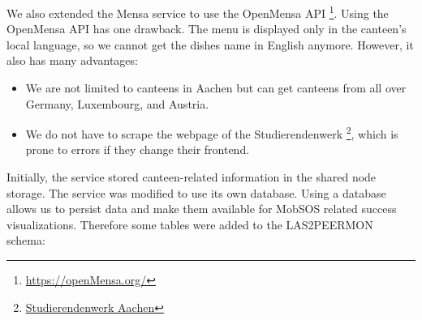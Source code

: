 We also extended the Mensa service to use the OpenMensa API \footnote{\url{https://openMensa.org/}}. 
Using the OpenMensa API has one drawback. The menu is displayed only in the canteen's local language, so we cannot get the dishes name in English anymore.
However, it also has many advantages:
\begin{itemize}
    \item We are not limited to canteens in Aachen but can get canteens from all over Germany, Luxembourg, and Austria. 
    \item We do not have to scrape the webpage of the Studierendenwerk \footnote{\href{https://www.studierendenwerk-aachen.de/}{Studierendenwerk Aachen}}, which is prone to errors if they change their frontend.
\end{itemize}
Initially, the service stored canteen-related information in the shared node storage. The service was modified to use its own database. Using a database allows us to persist data and make them available for MobSOS related success visualizations. 
Therefore some tables were added to the LAS2PEERMON schema:
